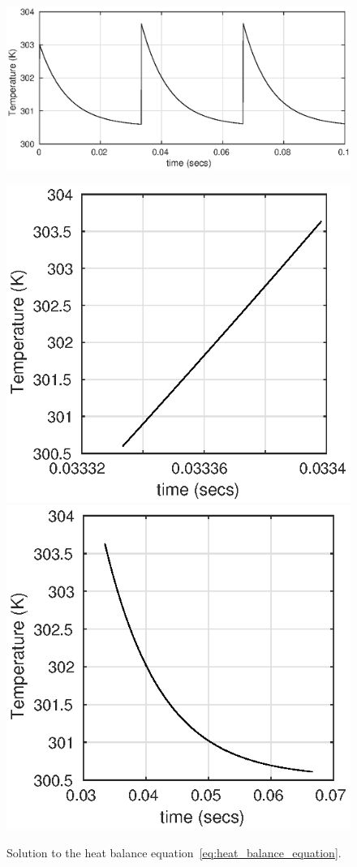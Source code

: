 \begin{figure}
\includegraphics[scale=0.9]{gfx/fig1_several_pulses.eps}
\caption{Solution to the heat balance equation~\eqref{eq:heat_balance_equation}.} \label{fig:solution_heat_balance_eq}
\includegraphics[scale=0.9]{gfx/fig1_int_time.eps}
\includegraphics[scale=0.9]{gfx/fig1_cooling.eps}

\end{figure}
